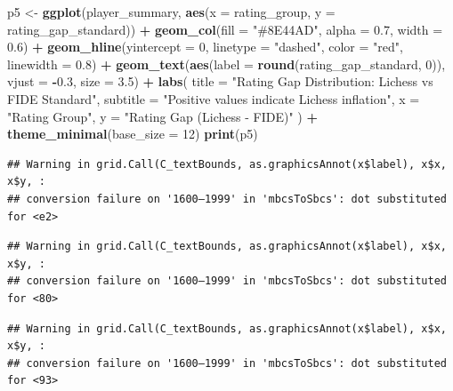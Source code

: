 \documentclass[
]{article}
\newenvironment{Shaded}{\begin{snugshade}}{\end{snugshade}}
\newcommand{\AttributeTok}[1]{\textcolor[rgb]{0.13,0.29,0.53}{#1}}
\newcommand{\DecValTok}[1]{\textcolor[rgb]{0.00,0.00,0.81}{#1}}
\newcommand{\FloatTok}[1]{\textcolor[rgb]{0.00,0.00,0.81}{#1}}
\newcommand{\FunctionTok}[1]{\textcolor[rgb]{0.13,0.29,0.53}{\textbf{#1}}}
\newcommand{\NormalTok}[1]{#1}
\newcommand{\OtherTok}[1]{\textcolor[rgb]{0.56,0.35,0.01}{#1}}
\newcommand{\SpecialCharTok}[1]{\textcolor[rgb]{0.81,0.36,0.00}{\textbf{#1}}}
\newcommand{\StringTok}[1]{\textcolor[rgb]{0.31,0.60,0.02}{#1}}
\begin{document}
\begin{Shaded}
\begin{Highlighting}[]
\NormalTok{p5 }\OtherTok{\textless{}{-}} \FunctionTok{ggplot}\NormalTok{(player\_summary, }\FunctionTok{aes}\NormalTok{(}\AttributeTok{x =}\NormalTok{ rating\_group, }\AttributeTok{y =}\NormalTok{ rating\_gap\_standard)) }\SpecialCharTok{+}
  \FunctionTok{geom\_col}\NormalTok{(}\AttributeTok{fill =} \StringTok{"\#8E44AD"}\NormalTok{, }\AttributeTok{alpha =} \FloatTok{0.7}\NormalTok{, }\AttributeTok{width =} \FloatTok{0.6}\NormalTok{) }\SpecialCharTok{+}
  \FunctionTok{geom\_hline}\NormalTok{(}\AttributeTok{yintercept =} \DecValTok{0}\NormalTok{, }\AttributeTok{linetype =} \StringTok{"dashed"}\NormalTok{, }\AttributeTok{color =} \StringTok{"red"}\NormalTok{, }\AttributeTok{linewidth =} \FloatTok{0.8}\NormalTok{) }\SpecialCharTok{+}
  \FunctionTok{geom\_text}\NormalTok{(}\FunctionTok{aes}\NormalTok{(}\AttributeTok{label =} \FunctionTok{round}\NormalTok{(rating\_gap\_standard, }\DecValTok{0}\NormalTok{)), }\AttributeTok{vjust =} \SpecialCharTok{{-}}\FloatTok{0.3}\NormalTok{, }\AttributeTok{size =} \FloatTok{3.5}\NormalTok{) }\SpecialCharTok{+}
  \FunctionTok{labs}\NormalTok{(}
    \AttributeTok{title =} \StringTok{"Rating Gap Distribution: Lichess vs FIDE Standard"}\NormalTok{,}
    \AttributeTok{subtitle =} \StringTok{"Positive values indicate Lichess inflation"}\NormalTok{,}
    \AttributeTok{x =} \StringTok{"Rating Group"}\NormalTok{,}
    \AttributeTok{y =} \StringTok{"Rating Gap (Lichess {-} FIDE)"}
\NormalTok{  ) }\SpecialCharTok{+}
  \FunctionTok{theme\_minimal}\NormalTok{(}\AttributeTok{base\_size =} \DecValTok{12}\NormalTok{)}
\FunctionTok{print}\NormalTok{(p5)}
\end{Highlighting}
\end{Shaded}

\begin{verbatim}
## Warning in grid.Call(C_textBounds, as.graphicsAnnot(x$label), x$x, x$y, :
## conversion failure on '1600–1999' in 'mbcsToSbcs': dot substituted for <e2>
\end{verbatim}

\begin{verbatim}
## Warning in grid.Call(C_textBounds, as.graphicsAnnot(x$label), x$x, x$y, :
## conversion failure on '1600–1999' in 'mbcsToSbcs': dot substituted for <80>
\end{verbatim}

\begin{verbatim}
## Warning in grid.Call(C_textBounds, as.graphicsAnnot(x$label), x$x, x$y, :
## conversion failure on '1600–1999' in 'mbcsToSbcs': dot substituted for <93>
\end{verbatim}
\end{document}
